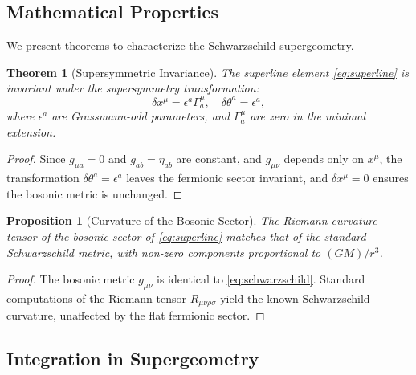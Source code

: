 \documentclass{article}
\theoremstyle{plain}
\newtheorem{theorem}{Theorem}
\newtheorem{proposition}{Proposition}
\begin{document}
\subsection{Mathematical Properties}

We present theorems to characterize the Schwarzschild supergeometry.

\begin{theorem}[Supersymmetric Invariance]
The superline element \eqref{eq:superline} is invariant under the supersymmetry transformation:
\begin{equation}
\delta x^{\mu} = \epsilon^{a} \Gamma^{\mu}_{a}, \quad \delta \theta^{a} = \epsilon^{a},
\end{equation}
where $\epsilon^{a}$ are Grassmann-odd parameters, and $\Gamma^{\mu}_{a}$ are zero in the minimal extension.
\end{theorem}

\begin{proof}
Since $g_{\mu a} = 0$ and $g_{ab} = \eta_{ab}$ are constant, and $g_{\mu\nu}$ depends only on $x^{\mu}$, the transformation $\delta \theta^{a} = \epsilon^{a}$ leaves the fermionic sector invariant, and $\delta x^{\mu} = 0$ ensures the bosonic metric is unchanged.
\end{proof}

\begin{proposition}[Curvature of the Bosonic Sector]
The Riemann curvature tensor of the bosonic sector of \eqref{eq:superline} matches that of the standard Schwarzschild metric, with non-zero components proportional to $(GM)/r^{3}$.
\end{proposition}

\begin{proof}
The bosonic metric $g_{\mu\nu}$ is identical to \eqref{eq:schwarzschild}. Standard computations of the Riemann tensor $R_{\mu\nu\rho\sigma}$ yield the known Schwarzschild curvature, unaffected by the flat fermionic sector.
\end{proof}

\subsection{Integration in Supergeometry}
\end{document}
